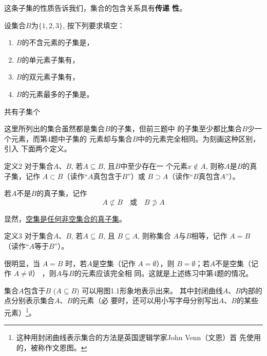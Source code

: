 这条子集的性质告诉我们，集合的包含关系具有\textbf{传递
性}。

\begin{ex}
    设集合$B$为$\{1,2,3\}$, 按下列要求填空：
\begin{enumerate}
\item $B$的不含元素的子集是\blank，
\item $B$的单元素子集有\blank，
\item $B$的双元素子集有\blank，
\item $B$的元素最多的子集是\blank。
\end{enumerate}
共有子集\blank 个
\end{ex}

这里所列出的集合虽然都是集合$B$的子集，但前三题中
的子集至少都比集合$B$少一个元素，而第4题中子集的
元素却与集合$B$中的元素完全相同。为刻画这种区别，引入
下面两个定义。

\begin{thm}{定义2}\CTEXindent
     对于集合$A$、$B$, 若$A\subseteq B$, 且$B$中至少存在一
个元素$x\notin A$, 则称$A$是$B$的真子集，记作
$A\subset B$（读作“$A$真包含于$B$”）或
$B\supset A$（读作“$B$真包含$A$”）。


若$A$不是$B$的真子集，记作
\[A\not\subset B\quad \text{或}\quad B\not\supset A\]
\end{thm}

显然，\underline{空集是任何非空集合的真子集}。

\begin{thm}{定义3}
    对于集合$A$、$B$, 若$A\subseteq B$, 且
$B\subseteq A$, 则称集合
$A$与$B$相等，记作
$A=B$（读作“$A$等于$B$”）。
\end{thm}

很明显，当
$A=B$
时，若$A$是空集（记作
$A=\emptyset$），则
$B=\emptyset$；若$A$不是空集（记作
$A\ne \emptyset$）
，则$A$与$B$的元素应该完全相
同。这就是上述练习中第4题的情况。

集合$A$包含于$B$ ($A\subseteq B$) 可以用图1.1形象地表示出来。
其中封闭曲线$A$、$B$内部的点分别表示集合$A$、$B$的元素（必
要时，还可以用小写字母分别写出$A$、$B$的某些元素）\footnote{这种用封闭曲线表示集合的方法是英国逻辑学家John Venn（文恩）首
先使用的，被称作文恩图。}。

\begin{figure}[htp]
    \centering
{}
    \caption{}
\end{figure}

